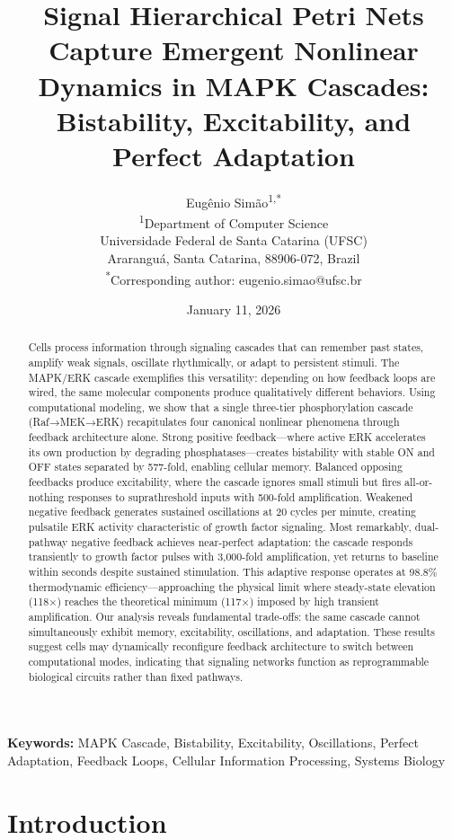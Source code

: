 \documentclass[twocolumn,11pt]{article}
\title{\textbf{Signal Hierarchical Petri Nets Capture Emergent Nonlinear Dynamics in MAPK Cascades: Bistability, Excitability, and Perfect Adaptation}}
\author{
Eugênio Simão\textsuperscript{1,*}\\
\textsuperscript{1}Department of Computer Science\\
Universidade Federal de Santa Catarina (UFSC)\\
Araranguá, Santa Catarina, 88906-072, Brazil\\
\textsuperscript{*}Corresponding author: eugenio.simao@ufsc.br
}
\date{January 11, 2026}
\begin{document}
\maketitle

\begin{abstract}
Cells process information through signaling cascades that can remember past states, amplify weak signals, oscillate rhythmically, or adapt to persistent stimuli. The MAPK/ERK cascade exemplifies this versatility: depending on how feedback loops are wired, the same molecular components produce qualitatively different behaviors. Using computational modeling, we show that a single three-tier phosphorylation cascade (Raf→MEK→ERK) recapitulates four canonical nonlinear phenomena through feedback architecture alone. Strong positive feedback—where active ERK accelerates its own production by degrading phosphatases—creates bistability with stable ON and OFF states separated by 577-fold, enabling cellular memory. Balanced opposing feedbacks produce excitability, where the cascade ignores small stimuli but fires all-or-nothing responses to suprathreshold inputs with 500-fold amplification. Weakened negative feedback generates sustained oscillations at 20 cycles per minute, creating pulsatile ERK activity characteristic of growth factor signaling. Most remarkably, dual-pathway negative feedback achieves near-perfect adaptation: the cascade responds transiently to growth factor pulses with 3,000-fold amplification, yet returns to baseline within seconds despite sustained stimulation. This adaptive response operates at 98.8\% thermodynamic efficiency—approaching the physical limit where steady-state elevation (118×) reaches the theoretical minimum (117×) imposed by high transient amplification. Our analysis reveals fundamental trade-offs: the same cascade cannot simultaneously exhibit memory, excitability, oscillations, and adaptation. These results suggest cells may dynamically reconfigure feedback architecture to switch between computational modes, indicating that signaling networks function as reprogrammable biological circuits rather than fixed pathways.
\end{abstract}

\textbf{Keywords:} MAPK Cascade, Bistability, Excitability, Oscillations, Perfect Adaptation, Feedback Loops, Cellular Information Processing, Systems Biology

\section*{Introduction}
\end{document}
